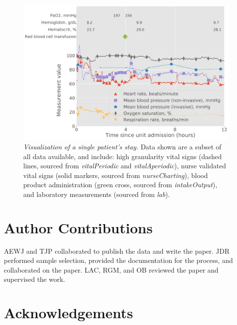 \documentclass[english]{article}
\newcommand{\tblname}[1]{\emph{#1}}
\begin{document}
\begin{figure}[htbp]
\includegraphics[width=1.0\textwidth]{img/ExamplePatient}
\caption{\emph{Visualization of a single patient's stay.} Data shown are a subset of all data available, and include: high granularity vital signs (dashed lines, sourced from \tblname{vitalPeriodic} and \tblname{vitalAperiodic}), nurse validated vital signs (solid markers, sourced from \tblname{nurseCharting}), blood product administration (green cross, sourced from \tblname{intakeOutput}), and laboratory measurements (sourced from \tblname{lab}). \label{fig:example_patient}}
\end{figure}

\section*{Author Contributions}\label{authorcontributions}

AEWJ and TJP collaborated to publish the data and write the paper. JDR performed sample selection, provided the documentation for the process, and collaborated on the paper. LAC, RGM, and OB reviewed the paper and supervised the work.

\section*{Acknowledgements}\label{acknowledgments}

\end{document}
